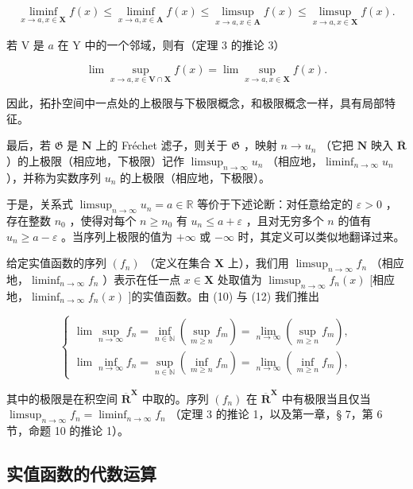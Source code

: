 \[
\liminf _ {x \to a, x \in \mathbf {X}} f (x) \leqslant \liminf _ {x \to a, x \in \mathbf {A}} f (x) \leqslant \limsup _ {x \to a, x \in \mathbf {A}} f (x) \leqslant \limsup _ {x \to a, x \in \mathbf {X}} f (x).
\]

若 V 是 \(a\) 在 Y 中的一个邻域，则有（定理 3 的推论 3）

\[
\lim \sup _ {x \to a, x \in \mathbf {V} \cap \mathbf {X}} f (x) = \lim \sup _ {x \to a, x \in \mathbf {X}} f (x).
\]

因此，拓扑空间中一点处的上极限与下极限概念，和极限概念一样，具有局部特征。

最后，若 \(\mathfrak{G}\) 是 \(\mathbf{N}\) 上的 Fréchet 滤子，则关于 \(\mathfrak{G}\) ，映射 \(n \to u_n\) （它把 \(\mathbf{N}\) 映入 \(\overline{\mathbf{R}}\) ）的上极限（相应地，下极限）记作 \(\limsup_{n \to \infty} u_n\) （相应地，\(\liminf_{n \to \infty} u_n\) ），并称为实数序列 \(u_n\) 的上极限（相应地，下极限）。

于是，关系式 \(\limsup_{n\to \infty}u_n = a\in \mathbb{R}\) 等价于下述论断：对任意给定的 \(\varepsilon >0\) ，存在整数 \(n_0\) ，使得对每个 \(n\geqslant n_0\) 有 \(u_{n}\leqslant a + \varepsilon\) ，且对无穷多个 \(n\) 的值有 \(u_{n}\geqslant a - \varepsilon\) 。当序列上极限的值为 \(+\infty\) 或 \(-\infty\) 时，其定义可以类似地翻译过来。

给定实值函数的序列 \((f_n)\) （定义在集合 \(\mathbf{X}\) 上），我们用 \(\limsup_{n\to \infty}f_n\) （相应地，\(\liminf_{n\to \infty} f_n\) ）表示在任一点 \(x\in \mathbf{X}\) 处取值为 \(\limsup_{n\to \infty}f_n(x)\) {[}相应地，\(\liminf_{n\to \infty} f_n(x)\) {]}的实值函数。由 (10) 与 (12) 我们推出

\[
\left\{\begin{array}{l}\lim \sup _ {n \rightarrow \infty} f _ {n} = \inf _ {n \in \mathbb {N}} (\sup _ {m \geqslant n} f _ {m}) = \lim _ {n \rightarrow \infty} (\sup _ {m \geqslant n} f _ {m}),\\\lim \inf _ {n \rightarrow \infty} f _ {n} = \sup _ {n \in \mathbb {N}} (\inf _ {m \geqslant n} f _ {m}) = \lim _ {n \rightarrow \infty} (\inf _ {m \geqslant n} f _ {m}),\end{array}\right.\tag{16}
\]

其中的极限是在积空间 \(\overline{\mathbf{R}}^{\mathbf{X}}\) 中取的。序列 \((f_n)\) 在 \(\overline{\mathbf{R}}^{\mathbf{X}}\) 中有极限当且仅当 \(\limsup_{n\to\infty}f_n=\liminf_{n\to\infty}f_n\) （定理 3 的推论 1，以及第一章，§ 7，第 6 节，命题 10 的推论 1）。

\subsection{实值函数的代数运算}

